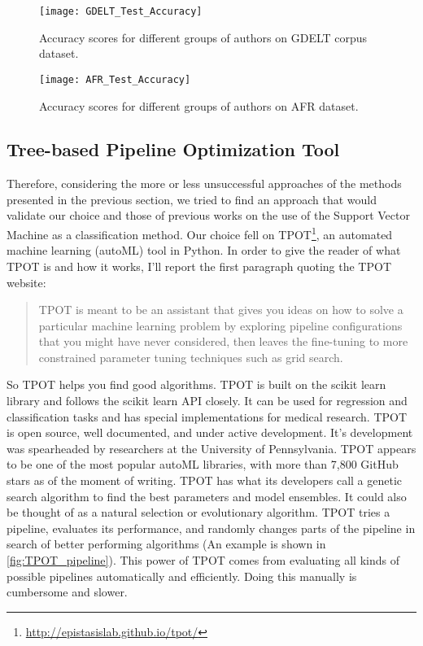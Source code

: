 \begin{figure}[ht]
	\centering
	\texttt{[image: GDELT\_Test\_Accuracy]}
	\caption[Methods performance on GDELT corpus]{Accuracy scores for different groups of authors on GDELT corpus dataset.}
	\label{fig:GDELT_methods_accuracy}
\end{figure}

\begin{figure}[ht]
	\centering
	\texttt{[image: AFR\_Test\_Accuracy]}
	\caption[Methods performance on AFR]{Accuracy scores for different groups of authors on AFR dataset.}
	\label{fig:AFR_methods_accuracy}
\end{figure}

\subsection{Tree-based Pipeline Optimization Tool}
Therefore, considering the more or less unsuccessful approaches of the methods presented in the previous section, we tried to find an approach that would validate our choice and those of previous works on the use of the Support Vector Machine as a classification method.
Our choice fell on TPOT\footnote{\url{http://epistasislab.github.io/tpot/}}, an automated machine learning (autoML) tool in Python.
In order to give the reader of what TPOT is and how it works, I'll report the first paragraph quoting the TPOT website:

\begin{quote}
	TPOT is meant to be an assistant that gives you ideas on how to solve a particular machine learning problem by exploring pipeline configurations that you might have never considered, then leaves the fine-tuning to more constrained parameter tuning techniques such as grid search.
\end{quote}
So TPOT helps you find good algorithms. TPOT is built on the scikit learn library and follows the scikit learn API closely. It can be used for regression and classification tasks and has special implementations for medical research.
TPOT is open source, well documented, and under active development. It’s development was spearheaded by researchers at the University of Pennsylvania. TPOT appears to be one of the most popular autoML libraries, with more than 7,800 GitHub stars as of the moment of writing.
TPOT has what its developers call a genetic search algorithm to find the best parameters and model ensembles. It could also be thought of as a natural selection or evolutionary algorithm. TPOT tries a pipeline, evaluates its performance, and randomly changes parts of the pipeline in search of better performing algorithms (An example is shown in \autoref{fig:TPOT_pipeline}).
This power of TPOT comes from evaluating all kinds of possible pipelines automatically and efficiently. Doing this manually is cumbersome and slower.

